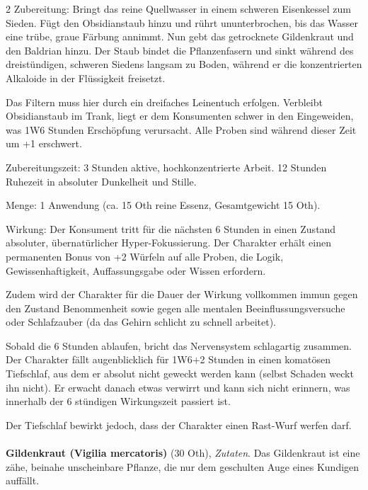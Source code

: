 \begin{multicols}{2}
    Zubereitung:
Bringt das reine Quellwasser in einem schweren Eisenkessel zum Sieden. Fügt den Obsidianstaub hinzu und rührt ununterbrochen, bis das Wasser eine trübe, graue Färbung annimmt. Nun gebt das getrocknete Gildenkraut und den Baldrian hinzu. Der Staub bindet die Pflanzenfasern und sinkt während des dreistündigen, schweren Siedens langsam zu Boden, während er die konzentrierten Alkaloide in der Flüssigkeit freisetzt.

Das Filtern muss hier durch ein dreifaches Leinentuch erfolgen. Verbleibt Obsidianstaub im Trank, liegt er dem Konsumenten schwer in den Eingeweiden, was 1W6 Stunden Erschöpfung verursacht. Alle Proben sind während dieser Zeit um +1 erschwert.

Zubereitungszeit:
3 Stunden aktive, hochkonzentrierte Arbeit. 12 Stunden Ruhezeit in absoluter Dunkelheit und Stille.

Menge: 1 Anwendung (ca. 15 Oth reine Essenz, Gesamtgewicht 15 Oth).

Wirkung:
Der Konsument tritt für die nächsten 6 Stunden in einen Zustand absoluter, übernatürlicher Hyper-Fokussierung.
Der Charakter erhält einen permanenten Bonus von +2 Würfeln auf alle Proben, die Logik, Gewissenhaftigkeit, Auffassungsgabe oder Wissen erfordern.

Zudem wird der Charakter für die Dauer der Wirkung vollkommen immun gegen den Zustand Benommenheit sowie gegen alle mentalen Beeinflussungsversuche oder Schlafzauber (da das Gehirn schlicht zu schnell arbeitet).

Sobald die 6 Stunden ablaufen, bricht das Nervensystem schlagartig zusammen. Der Charakter fällt augenblicklich für 1W6+2 Stunden in einen komatösen Tiefschlaf, aus dem er absolut nicht geweckt werden kann (selbst Schaden weckt ihn nicht). Er erwacht danach etwas verwirrt und kann sich nicht erinnern, was innerhalb der 6 stündigen Wirkungszeit passiert ist. 

Der Tiefschlaf bewirkt jedoch, dass der Charakter einen Rast-Wurf werfen darf.

    \paragraph{}
    \begin{denseitemize}
        \item \textbf{Gildenkraut (Vigilia mercatoris)} (30 Oth), \textit{Zutaten}.
        Das Gildenkraut ist eine zähe, beinahe unscheinbare Pflanze, die nur dem geschulten Auge eines Kundigen auffällt.


\end{denseitemize}
\end{multicols}
